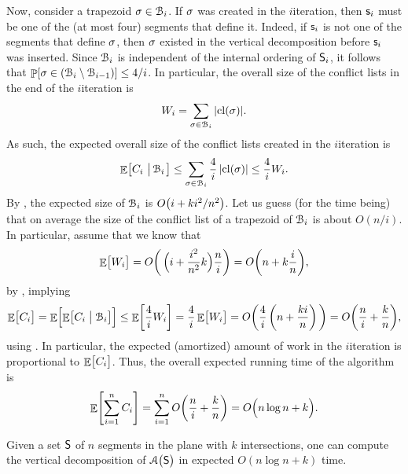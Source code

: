 Now, consider a trapezoid $\sigma \in \EuScript{B}_i$. If $\sigma$ was created
in the $i$\th iteration, then $\mathsf{s}_i$ must be one of the (at most
four) segments that define it. Indeed, if $\mathsf{s}_i$ is not one of the
segments that define $\sigma$, then $\sigma$ existed in the vertical
decomposition before $\mathsf{s}_i$ was inserted.  Since $\EuScript{B}_i$ is
independent of the internal ordering of $\mathsf{S}_i$, it follows that
$\Prob{ \sigma \in (\ArrB_i \setminus \ArrB_{i-1})} \leq 4/i$. In
particular, the overall size of the conflict lists in the end of the
$i$\th iteration is
\begin{equation*}
    W_i = \sum_{\sigma \in \EuScript{B}_i} {|{\mathrm{cl}}(\sigma)|}.
\end{equation*}
As such, the expected overall size of the conflict lists created in
the $i$\th iteration is
\begin{equation*}
  \mathop{\mathbb{E}}\!\left[ { C_i \,\left|\, { \EuScript{B}_i } \bigr.\right.} \right] \leq \sum_{\sigma \in \EuScript{B}_i}
  \frac{4}{i} \left| {{\mathrm{cl}}(\sigma)} \right| \leq \frac{4}{i} W_i.
\end{equation*}
By , the expected size of $\EuScript{B}_i$ is $O\pth{i +
   k i^2/n^2}$. Let us guess (for the time being) that on average the
size of the conflict list of a trapezoid of $\EuScript{B}_i$ is about
$O(n/i)$.  In particular, assume that we know that
\begin{equation*}
    \Ex{\bigl. W_i}%
    =%
    O\pth{ \, \Bigl( i + \frac{i^2}{n^2} k \Bigr) \frac{n}{i}}%
    =%
    O\pth{ n + k \frac{i}{n} },
\end{equation*}
by , implying
\begin{equation}
    \Ex{\bigl. C_i }%
    =%
    \Ex{  \Bigl. \ExCond{C_i}{ \bigl. \ArrB_i } }%
    \leq%
    \Ex{ \frac{4}{i} W_i}%
    =%
    \frac{4}{i} \Ex{ \bigl. W_i }%
    =%
    O \pth{ \frac{4}{i}
       \, \pth{n + \frac{k i}{n} } \, }%
    =%
    O\pth{\frac{n}{i} +
       \frac{k}{n}},
    \eqlab{conflict:lists:3}
\end{equation}
using .  In particular, the expected
(amortized) amount of work in the $i$\th iteration is proportional to
$\mathop{\mathbb{E}}\!\left[ {\bigl. C_i} \right]$. Thus, the overall expected running time of the
algorithm is
\begin{equation*}
    \Ex{ \sum_{i=1}^{n} C_i }%
    =%
    \sum_{i=1}^{n} O\pth{\frac{n}{i} + \frac{k}{n}}%
    =%
    O\pth{\Bigl. n\log{n} + k }.
\end{equation*}

\begin{theorem}
    Given a set $\mathsf{S}$ of $n$ segments in the plane with $k$
    intersections, one can compute the vertical decomposition of
    $\ArrX{\bigl. \SegSet }$ in expected $O(n \log{n} + k )$ time.
\end{theorem}

